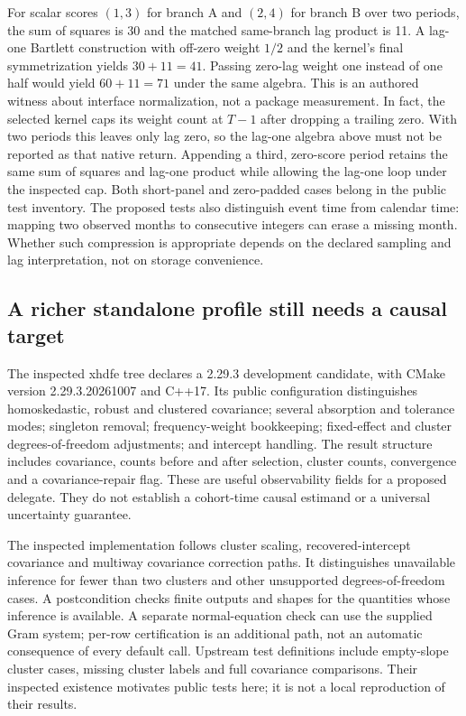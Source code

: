 For scalar scores $(1,3)$ for branch A and $(2,4)$ for branch B over two
periods, the sum of squares is 30 and the matched same-branch lag product
is 11. A lag-one Bartlett construction with off-zero weight $1/2$ and the
kernel's final symmetrization yields $30+11=41$. Passing zero-lag weight
one instead of one half would yield $60+11=71$ under the same algebra.
This is an authored witness about interface normalization, not a package
measurement. In fact, the selected kernel caps its weight count at $T-1$
after dropping a trailing zero. With two periods this leaves only lag zero,
so the lag-one algebra above must not be reported as that native return.
Appending a third, zero-score period retains the same sum of squares and
lag-one product while allowing the lag-one loop under the inspected cap.
Both short-panel and zero-padded cases belong in the public test inventory.
\citep{exec25_panelcxx_fixest,exec25_panelcxx_reference} The proposed tests also distinguish event time from calendar
time: mapping two observed months to consecutive integers can erase a
missing month. Whether such compression is appropriate depends on the
declared sampling and lag interpretation, not on storage convenience.
\citep{exec25_panelcxx_reference}

\subsection{A richer standalone profile still needs a causal target}
The inspected xhdfe tree declares a 2.29.3 development candidate, with CMake
version 2.29.3.20261007 and C++17. Its public configuration distinguishes
homoskedastic, robust and clustered covariance; several absorption and
tolerance modes; singleton removal; frequency-weight bookkeeping;
fixed-effect and cluster degrees-of-freedom adjustments; and intercept
handling. The result structure includes covariance, counts before and after
selection, cluster counts, convergence and a covariance-repair flag. These
are useful observability fields for a proposed delegate. They do not
establish a cohort-time causal estimand or a universal uncertainty guarantee.
\citep{exec25_panelcxx_xhdfe}

The inspected implementation follows cluster scaling, recovered-intercept
covariance and multiway covariance correction paths. It distinguishes
unavailable inference for fewer than two clusters and other unsupported
degrees-of-freedom cases. A postcondition checks finite outputs and shapes
for the quantities whose inference is available. A separate normal-equation
check can use the supplied Gram system; per-row certification is an
additional path, not an automatic consequence of every default call.
Upstream test definitions include empty-slope cluster cases, missing cluster
labels and full covariance comparisons. Their inspected existence motivates
public tests here; it is not a local reproduction of their results.
\citep{exec25_panelcxx_xhdfe}

